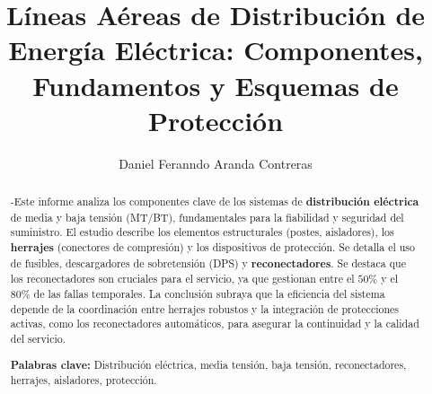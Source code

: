 \documentclass[
    man,        %
    a4paper,    %
    12pt,       %
    doname
]{apa7}
\title{Líneas Aéreas de Distribución de Energía Eléctrica: Componentes, Fundamentos y Esquemas de Protección}
\author{Daniel Feranndo Aranda Contreras} %
\affiliation{Escuela E3T, Universidad Industrial de Santander} %
\begin{document}
\maketitle

\begin{abstract}
-Este informe analiza los componentes clave de los sistemas de \textbf{distribución eléctrica} de media y baja tensión (MT/BT), fundamentales para la fiabilidad y seguridad del suministro. El estudio describe los elementos estructurales (postes, aisladores), los \textbf{herrajes} (conectores de compresión) y los dispositivos de protección. Se detalla el uso de fusibles, descargadores de sobretensión (DPS) y \textbf{reconectadores}. Se destaca que los reconectadores son cruciales para el servicio, ya que gestionan entre el $50\%$ y el $80\%$ de las fallas temporales. La conclusión subraya que la eficiencia del sistema depende de la coordinación entre herrajes robustos y la integración de protecciones activas, como los reconectadores automáticos, para asegurar la continuidad y la calidad del servicio.

\vspace{1em} %
\noindent\textbf{Palabras clave:} Distribución eléctrica, media tensión, baja tensión, reconectadores, herrajes, aisladores, protección.
\end{abstract}
\newpage



\nocite{*} %
\printbibliography
\end{document}
